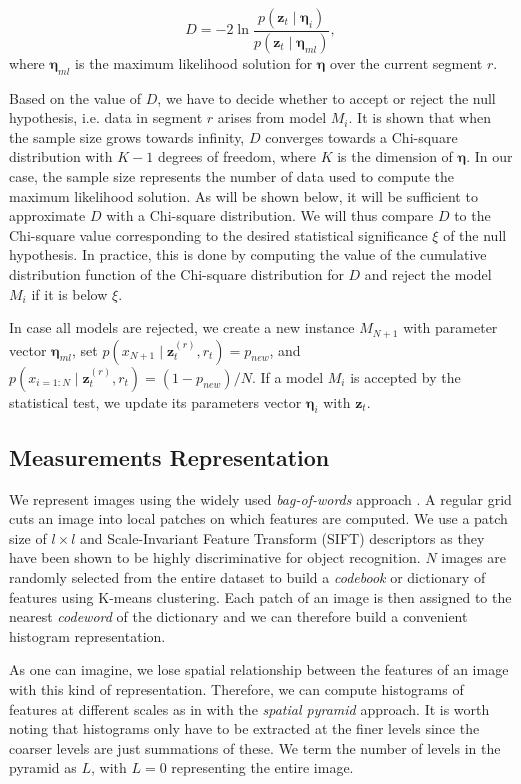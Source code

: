 \begin{equation}
\label{eqn:statistic}
D = -2\ln\frac{p(\mathbf{z}_t\mid \boldsymbol{\eta}_i)}{p(\mathbf{z}_t\mid \boldsymbol{\eta}_{ml})},
\end{equation}
where $\boldsymbol{\eta}_{ml}$ is the maximum likelihood solution for
$\boldsymbol{\eta}$ over the current segment $r$.

Based on the value of $D$, we have to decide whether to accept or
reject the null hypothesis, i.e. data in segment $r$ arises from model
$M_i$. It is shown that when the sample size grows towards infinity,
$D$ converges towards a Chi-square distribution with $K-1$ degrees of
freedom, where $K$ is the dimension of $\boldsymbol{\eta}$. In our
case, the sample size represents the number of data used to compute
the maximum likelihood solution. As will be shown below, it will be
sufficient to approximate $D$ with a Chi-square distribution.  We will
thus compare $D$ to the Chi-square value corresponding to the desired
statistical significance $\xi$ of the null hypothesis. In practice,
this is done by computing the value of the cumulative distribution
function of the Chi-square distribution for $D$ and reject the model
$M_i$ if it is below $\xi$.

In case all models are rejected, we create a new instance $M_{N+1}$
with parameter vector $\boldsymbol{\eta}_{ml}$, set $p(x_{N+1}\mid
\mathbf{z}_t^{(r)},r_t)=p_{new}$, and $p(x_{i=1:N}\mid
\mathbf{z}_t^{(r)},r_t)=(1-p_{new})/N$. If a model $M_i$ is accepted
by the statistical test, we update its parameters vector
$\boldsymbol{\eta}_i$ with $\mathbf{z}_t$.

\subsection{Measurements Representation}
We represent images using the widely used \emph{bag-of-words}
approach
. A regular grid cuts an image into local patches on
which features are computed.  We use a patch size of $l\times l$ and
Scale-Invariant Feature Transform (SIFT) \cite{lowe04distinctive}
descriptors as they have been shown to be highly discriminative for
object recognition. $N$ images are randomly selected from the entire
dataset to build a \emph{codebook} or dictionary of features using
K-means clustering. Each patch of an image is then assigned to the
nearest \emph{codeword} of the dictionary and we can therefore build a
convenient histogram representation.

As one can imagine, we lose spatial relationship between the features of an
image with this kind of representation. Therefore, we can compute histograms of
features at different scales as in \cite{lazebnik06beyond} with the
\emph{spatial pyramid} approach. It is worth noting that histograms only have to
be extracted at the finer levels since the coarser levels are just summations of
these. We term the number of levels in the pyramid as $L$, with $L=0$
representing the entire image.


